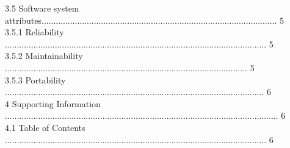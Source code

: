 \documentclass[10pt,draftclsnofoot,onecolumn]{IEEEtran}
\newcommand\tab[1][1cm]{\hspace*{#1}}
\begin{document}
\tab 3.5 Software system attributes................................................................................................... 5\\
  \vspace{5mm}
\tab \tab 3.5.1 Reliability .............................................................................................................. 5\\
                 \vspace{5mm}
\tab \tab 3.5.2 Maintainability ...................................................................................................... 5\\
                 \vspace{5mm}
\tab \tab 3.5.3 Portability ............................................................................................................. 6\\
                 \vspace{5mm}
4 Supporting Information ................................................................................................................... 6\\
                 \vspace{5mm}
\tab 4.1 Table of Contents .............................................................................................................. 6\\
                 \vspace{5mm}
\end{document}
